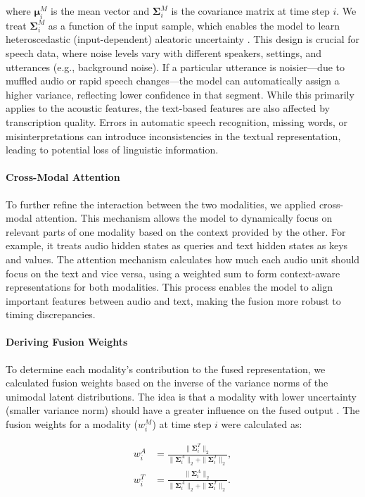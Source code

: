 \documentclass[9pt,a4paper]{rho-class/rho}
\begin{document}
where \(\boldsymbol{\mu}_i^M\) is the mean vector and \(\boldsymbol{\Sigma}_i^M\) is the covariance matrix at time step \(i\). We treat \(\boldsymbol{\Sigma}_i^M\) as a function of the input sample, which enables the model to learn heteroscedastic (input-dependent) aleatoric uncertainty \cite{kendall2017uncertainties}. This design is crucial for speech data, where noise levels vary with different speakers, settings, and utterances (e.g., background noise). If a particular utterance is noisier—due to muffled audio or rapid speech changes—the model can automatically assign a higher variance, reflecting lower confidence in that segment. While this primarily applies to the acoustic features, the text-based features are also affected by transcription quality. Errors in automatic speech recognition, missing words, or misinterpretations can introduce inconsistencies in the textual representation, leading to potential loss of linguistic information.

\paragraph{Cross-Modal Attention} To further refine the interaction between the two modalities, we applied cross-modal attention. This mechanism allows the model to dynamically focus on relevant parts of one modality based on the context provided by the other. For example, it treats audio hidden states as queries and text hidden states as keys and values. The attention mechanism calculates how much each audio unit should focus on the text and vice versa, using a weighted sum to form context-aware representations for both modalities. This process enables the model to align important features between audio and text, making the fusion more robust to timing discrepancies.

\paragraph{Deriving Fusion Weights}

To determine each modality's contribution to the fused representation, we calculated fusion weights based on the inverse of the variance norms of the unimodal latent distributions. The idea is that a modality with lower uncertainty (smaller variance norm) should have a greater influence on the fused output \cite{tel}. The fusion weights for a modality ($w_i^M$) at time step $i$ were calculated as:

\begin{align*}
    w_i^A &= \frac{\| \boldsymbol{\Sigma}_i^T \|_2}{\| \boldsymbol{\Sigma}_i^A \|_2 + \| \boldsymbol{\Sigma}_i^T \|_2}, \\
    w_i^T &= \frac{\| \boldsymbol{\Sigma}_i^A \|_2}{\| \boldsymbol{\Sigma}_i^A \|_2 + \| \boldsymbol{\Sigma}_i^T \|_2}.
\end{align*}
\end{document}
